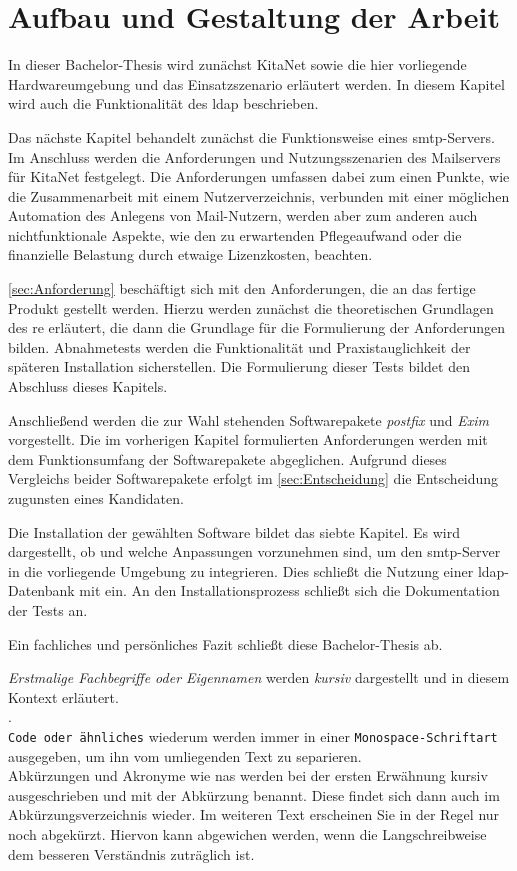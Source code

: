 \section{Aufbau und Gestaltung der Arbeit}

In dieser Bachelor-Thesis wird zunächst KitaNet sowie die hier vorliegende Hardwareumgebung und das Einsatzszenario erläutert werden. 
In diesem Kapitel wird auch die Funktionalität des \ac{ldap} beschrieben.

Das nächste Kapitel behandelt zunächst die Funktionsweise eines \ac{smtp}-Servers. Im Anschluss werden die Anforderungen und Nutzungsszenarien des Mailservers für KitaNet festgelegt. 
Die Anforderungen umfassen dabei zum einen Punkte, wie die Zusammenarbeit mit einem Nutzerverzeichnis, verbunden mit einer möglichen Automation des Anlegens von Mail-Nutzern, werden aber zum anderen auch nichtfunktionale Aspekte, wie den zu erwartenden Pflegeaufwand oder die finanzielle Belastung durch etwaige Lizenzkosten, beachten. 

\autoref{sec:Anforderung} beschäftigt sich mit den Anforderungen, die an das fertige Produkt gestellt werden. Hierzu werden zunächst die theoretischen Grundlagen des \ac{re} erläutert, die dann die Grundlage für die Formulierung der Anforderungen bilden. Abnahmetests werden die Funktionalität und Praxistauglichkeit der späteren Installation sicherstellen. Die Formulierung dieser Tests bildet den Abschluss  dieses Kapitels.

Anschließend werden die zur Wahl stehenden Softwarepakete \textit{postfix} und \textit{Exim} vorgestellt. Die im vorherigen Kapitel formulierten Anforderungen werden mit dem Funktionsumfang der Softwarepakete abgeglichen. Aufgrund dieses Vergleichs beider Softwarepakete erfolgt im \autoref{sec:Entscheidung} die Entscheidung zugunsten eines Kandidaten. 

Die Installation der gewählten Software bildet das siebte Kapitel. Es wird dargestellt, ob und welche Anpassungen vorzunehmen sind, um den \ac{smtp}-Server in die vorliegende Umgebung zu integrieren. Dies schließt die Nutzung einer \ac{ldap}-Datenbank mit ein. 
An den Installationsprozess schließt sich die Dokumentation der Tests an.

Ein fachliches und persönliches Fazit schließt diese Bachelor-Thesis ab.

\textit{Erstmalige Fachbegriffe oder Eigennamen} werden \textit{kursiv} dargestellt und in diesem Kontext erläutert.  \\ . \\ \verb+Code oder ähnliches+ wiederum werden immer in einer \verb+Monospace-Schriftart+ ausgegeben, um ihn vom umliegenden Text zu separieren. \\ Abkürzungen und Akronyme wie \zb \ac{nas} werden bei der ersten Erwähnung kursiv ausgeschrieben und mit der Abkürzung benannt. Diese findet sich dann auch im Abkürzungsverzeichnis wieder. Im weiteren Text erscheinen Sie in der Regel nur noch abgekürzt. Hiervon kann abgewichen werden, wenn die Langschreibweise dem besseren Verständnis zuträglich ist.

